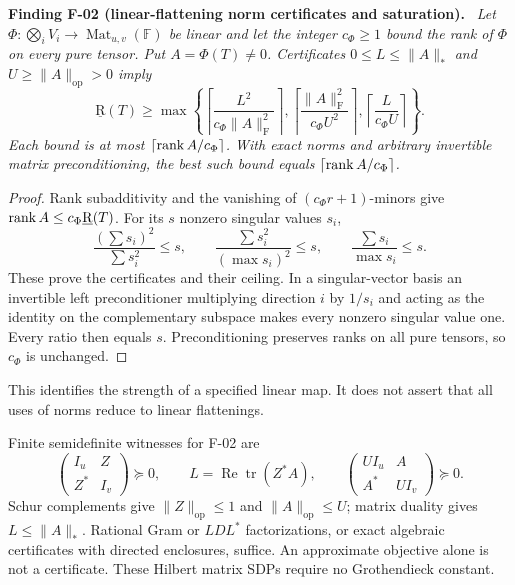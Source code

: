 \documentclass[11pt]{article}
\newcommand{\Z}{\mathbb Z}\newcommand{\Q}{\mathbb Q}
\newcommand{\F}{\mathbb F}
\newcommand{\BR}{\underline{\mathrm R}}\newcommand{\TR}{\mathrm R}
\newcommand{\HS}[1]{\lVert #1\rVert_{\mathrm F}}
\newcommand{\op}[1]{\lVert #1\rVert_{\mathrm{op}}}
\newcommand{\nuc}[1]{\lVert #1\rVert_*}
\newcommand{\tr}{\operatorname{tr}}\newcommand{\id}{\operatorname{id}}
\newcommand{\ceil}[1]{\left\lceil#1\right\rceil}
\newenvironment{finding}[2]{\par\medskip\noindent\textbf{Finding #1 (#2).}\ \itshape}{\par\medskip}
\begin{document}
\begin{finding}{F-02}{linear-flattening norm certificates and saturation}
Let $\Phi:\bigotimes_i V_i\to\operatorname{Mat}_{u,v}(\F)$ be linear
and let the integer $c_\Phi\geq1$ bound the rank of $\Phi$ on every
pure tensor. Put $A=\Phi(T)\ne0$. Certificates
$0\leq L\leq\nuc A$ and $U\geq\op A>0$ imply
\begin{equation}\label{eq:matrix-cert}
\BR(T)\geq\max\left\{
\ceil{\frac{L^2}{c_\Phi\HS A^2}},
\ceil{\frac{\HS A^2}{c_\Phi U^2}},
\ceil{\frac L{c_\Phi U}}\right\}.
\end{equation}
Each bound is at most $\ceil{\rank A/c_\Phi}$.
With exact norms and arbitrary invertible matrix preconditioning,
the best such bound equals $\ceil{\rank A/c_\Phi}$.
\end{finding}
\begin{proof}
Rank subadditivity and the vanishing of $(c_\Phi r+1)$-minors give
$\rank A\leq c_\Phi\BR(T)$. For its $s$ nonzero singular values $s_i$,
\[
 \frac{(\sum s_i)^2}{\sum s_i^2}\leq s,\qquad
 \frac{\sum s_i^2}{(\max s_i)^2}\leq s,\qquad
 \frac{\sum s_i}{\max s_i}\leq s.
\]
These prove the certificates and their ceiling. In a singular-vector
basis an invertible left preconditioner multiplying direction $i$
by $1/s_i$ and acting as the identity on the complementary subspace
makes every nonzero singular value one. Every ratio then equals $s$.
Preconditioning preserves ranks on all pure tensors, so $c_\Phi$
is unchanged.
\end{proof}
This identifies the strength of a specified linear map. It does not
assert that all uses of norms reduce to linear flattenings.

Finite semidefinite witnesses for F-02 are
\[
\begin{pmatrix}I_u&Z\\Z^*&I_v\end{pmatrix}\succeq0,\qquad
L=\operatorname{Re}\tr(Z^*A),\qquad
\begin{pmatrix}UI_u&A\\A^*&UI_v\end{pmatrix}\succeq0 .
\]
Schur complements give $\op Z\leq1$ and $\op A\leq U$; matrix duality
gives $L\leq\nuc A$. Rational Gram or $LDL^*$ factorizations,
or exact algebraic certificates with directed enclosures, suffice.
An approximate objective alone is not a certificate. These Hilbert
matrix SDPs require no Grothendieck constant.
\end{document}
